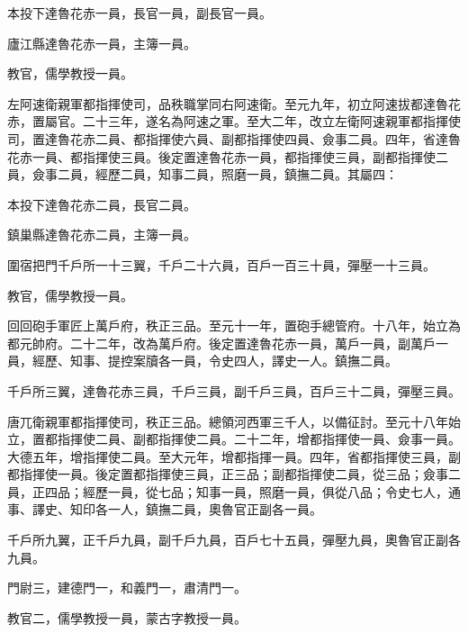 \begin{pinyinscope}
 本投下達魯花赤一員，長官一員，副長官一員。



 廬江縣達魯花赤一員，主簿一員。



 教官，儒學教授一員。



 左阿速衛親軍都指揮使司，品秩職掌同右阿速衛。至元九年，初立阿速拔都達魯花赤，置屬官。二十三年，遂名為阿速之軍。至大二年，改立左衛阿速親軍都指揮使司，置達魯花赤二員、都指揮使六員、副都指揮使四員、僉事二員。四年，省達魯花赤一員、都指揮使三員。後定置達魯花赤一員，都指揮使三員，副都指揮使二員，僉事二員，經歷二員，知事二員，照磨一員，鎮撫二員。其屬四：



 本投下達魯花赤二員，長官二員。



 鎮巢縣達魯花赤二員，主簿一員。



 圍宿把門千戶所一十三翼，千戶二十六員，百戶一百三十員，彈壓一十三員。



 教官，儒學教授一員。



 回回砲手軍匠上萬戶府，秩正三品。至元十一年，置砲手總管府。十八年，始立為都元帥府。二十二年，改為萬戶府。後定置達魯花赤一員，萬戶一員，副萬戶一員，經歷、知事、提控案牘各一員，令史四人，譯史一人。鎮撫二員。



 千戶所三翼，達魯花赤三員，千戶三員，副千戶三員，百戶三十二員，彈壓三員。



 唐兀衛親軍都指揮使司，秩正三品。總領河西軍三千人，以備征討。至元十八年始立，置都指揮使二員、副都指揮使二員。二十二年，增都指揮使一員、僉事一員。大德五年，增指揮使二員。至大元年，增都指揮一員。四年，省都指揮使三員，副都指揮使一員。後定置都指揮使三員，正三品；副都指揮使二員，從三品；僉事二員，正四品；經歷一員，從七品；知事一員，照磨一員，俱從八品；令史七人，通事、譯史、知印各一人，鎮撫二員，奧魯官正副各一員。



 千戶所九翼，正千戶九員，副千戶九員，百戶七十五員，彈壓九員，奧魯官正副各九員。



 門尉三，建德門一，和義門一，肅清門一。



 教官二，儒學教授一員，蒙古字教授一員。




\end{pinyinscope}
